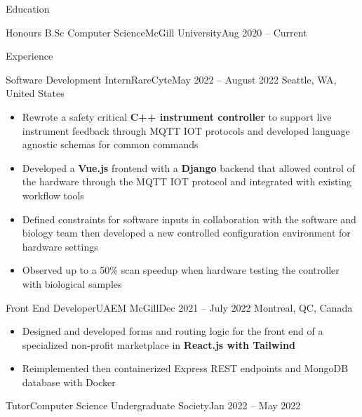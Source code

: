 \documentclass[]{mcdowellcv}
\begin{document}
\let\CITY=S

\let\WEB=T

\makeheader

\begin{cvsection}{Education}
	\begin{cvsubsection}{\normalfont Honours B.Sc Computer Science}{McGill University}{Aug 2020 -- Current}
	\end{cvsubsection}
	\vspace{-13mm}
\end{cvsection}
\begin{cvsection}{Experience}
	\begin{cvsubsection}{Software Development Intern}{RareCyte}{May 2022 -- August 2022}
		Seattle, WA, United States
		\begin{itemize}%
			\item Rewrote a safety critical \textbf{C++ instrument controller} to support live instrument feedback through MQTT IOT protocols and developed language agnostic schemas for common commands
			\item Developed a \textbf{Vue.js} frontend with a \textbf{Django} backend that allowed control of the hardware through the MQTT IOT protocol and integrated with existing workflow tools
			\item Defined constraints for software inputs in collaboration with the software and biology team then developed a new controlled configuration environment for hardware settings
			\item Observed up to a 50\% scan speedup when hardware testing the controller with biological samples
		\end{itemize}
	\end{cvsubsection}
	\begin{cvsubsection}{Front End Developer}{UAEM McGill}{Dec 2021 -- July 2022}
		\vspace{-2.5mm}
		Montreal, QC, Canada
		\begin{itemize}%
			\item Designed and developed forms and routing logic for the front end of a specialized non-profit marketplace in \textbf{React.js with Tailwind}
			\item Reimplemented then containerized Express REST endpoints and MongoDB database with Docker
		\end{itemize}
	\end{cvsubsection}
	\begin{cvsubsection}{Tutor}{Computer Science Undergraduate Society}{Jan 2022 -- May 2022}

\end{cvsubsection}
\end{cvsection}
\end{document}
